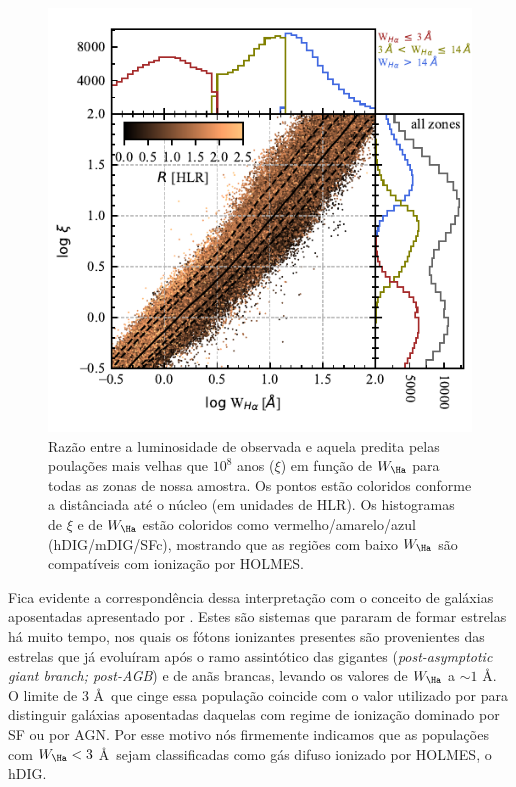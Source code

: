 \begin{figure}
 \includegraphics[scale=1.5]{figuras/fig_logxi_logWHa_histograms.pdf}
 \caption[$\log \xi \times \log {\rm H}\alpha$]
 {Razão entre a luminosidade de \Ha observada e aquela predita pelas poulações mais velhas que $10^8$ anos ($\xi$) em função de $W_{\Ha}$ para todas as zonas de nossa amostra. Os pontos estão coloridos conforme a distânciada até o núcleo (em unidades de HLR). Os histogramas de $\xi$ e de $W_{\Ha}$ estão coloridos como vermelho/amarelo/azul (hDIG/mDIG/SFc), mostrando que as regiões com baixo $W_{\Ha}$ são compatíveis com ionização por HOLMES.}
 \label{fig:WHa-Xi}
\end{figure}

Fica evidente a correspondência dessa interpretação com o conceito de galáxias aposentadas apresentado por \citet{Stasinska.etal.2008a}. Estes são sistemas que pararam de formar estrelas há muito tempo, nos quais os fótons ionizantes presentes são provenientes das estrelas que já evoluíram após o ramo assintótico das gigantes ({\em post-asymptotic giant branch; post-AGB}) e de anãs brancas, levando os valores de $W_{\Ha}$ a $\sim 1$ \AA. O limite de 3 \AA\ que cinge essa população coincide com o valor utilizado por \citet{CidFernandes.etal.2011a} para distinguir galáxias aposentadas daquelas com regime de ionização dominado por SF ou por AGN. Por esse motivo nós firmemente indicamos que as populações com $W_{\Ha} < 3$ \AA\ sejam classificadas como gás difuso ionizado por HOLMES, o hDIG.

